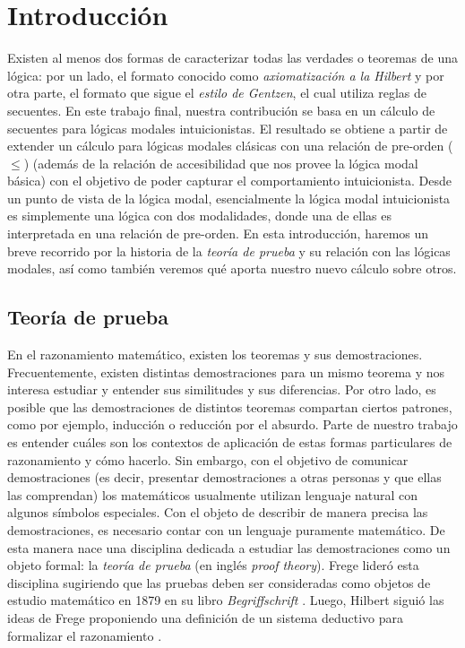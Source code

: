 \renewcommand{\chaptername}{}
\chapter{Introducción}
Existen al menos dos formas de caracterizar todas las verdades o teoremas de una lógica: por un lado, el formato conocido como \emph{axiomatización a la Hilbert} y por otra parte, el formato que sigue el \emph{estilo de Gentzen}, el cual utiliza reglas de secuentes. 
En este trabajo final, nuestra contribución se basa en un cálculo de secuentes para lógicas modales intuicionistas. El resultado se obtiene a partir de extender un cálculo para lógicas modales clásicas con una relación de pre-orden ($\le$) (además de la relación de accesibilidad que nos provee la lógica modal básica) con el objetivo de poder capturar el comportamiento intuicionista. Desde un punto de vista de la lógica modal, esencialmente la lógica modal intuicionista es simplemente una lógica con dos modalidades, donde una de ellas es interpretada en una relación de pre-orden. En esta introducción, haremos un breve recorrido por la historia de la \emph{teoría de prueba} y su relación con las lógicas modales, así como también veremos qué aporta nuestro nuevo cálculo sobre otros.

\section{Teoría de prueba}
En el razonamiento matemático, existen los teoremas y sus demostraciones. Frecuentemente, existen distintas demostraciones para un mismo teorema y nos interesa estudiar y entender sus similitudes y sus diferencias. Por otro lado, es posible que las demostraciones de distintos teoremas compartan ciertos patrones, como por ejemplo, inducción o reducción por el absurdo. Parte de nuestro trabajo es entender cuáles son los contextos de aplicación de estas formas particulares de razonamiento y cómo hacerlo. Sin embargo, con el objetivo de comunicar demostraciones (es decir, presentar demostraciones a otras personas y que ellas las comprendan) los matemáticos usualmente utilizan lenguaje natural con algunos símbolos especiales. Con el objeto de describir de manera precisa las demostraciones, es necesario contar con un lenguaje puramente matemático. De esta manera nace una disciplina dedicada a estudiar las demostraciones como un objeto formal: la \textit{teoría de prueba} (en inglés \textit{proof theory}). Frege lideró esta disciplina sugiriendo que las pruebas deben ser consideradas como objetos de estudio matemático en 1879 en su libro \textit{Begriffschrift} \cite{frege1879}. Luego, Hilbert siguió las ideas de Frege proponiendo una definición de un sistema deductivo para formalizar el razonamiento \cite{hilbert1967}.

